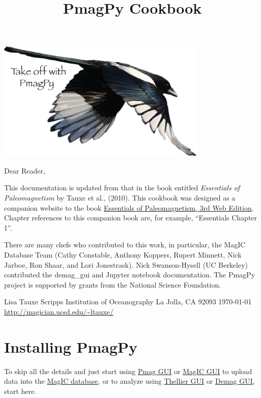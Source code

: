 \documentclass[11pt]{book}
\begin{document}
 \setcounter{tocdepth}{3}
\tableofcontents


{\hskip 1in \includegraphics[width=10cm]{EPSfiles/logo.eps}

 \title{PmagPy Cookbook}

 \maketitle
\noindent Dear Reader,

This documentation is updated from that in the book entitled {\it Essentials of Paleomagnetism} by  Tauxe et al., (2010). \nocite{tauxe10}  This cookbook was designed as a companion website to the book \href{http://earthref.org/MAGIC/books/Tauxe/Essentials/WebBook3.html}{Essentials of Paleomagnetism, 3rd Web Edition}. Chapter references to this companion book are, for example, ``Essentials Chapter 1''.

There are many chefs who contributed to this work, in particular, the MagIC Database Team (Cathy Constable, Anthony Koppers, Rupert Minnett, Nick Jarboe, Ron Shaar, and Lori Jonestrask). Nick Swanson-Hysell (UC Berkeley) contributed the demag\_gui and Jupyter notebook documentation. The PmagPy project is supported by grants from the National Science Foundation.

{\obeylines
 Lisa Tauxe
 Scripps Institution of Oceanography
 La Jolla, CA 92093
 \today
  \url{http://magician.ucsd.edu/~ltauxe/}
 }


\chapter{Installing {\bf PmagPy}}

To skip all the details and just start using \href{#pmag_gui.py}{Pmag GUI} or \href{#magic_gui.py}{MagIC GUI} to upload data into the \href{#MagICDatabase}{MagIC database}, or to analyze using \href{#thellier_GUI.py}{Thellier GUI} or \href{#DemagGUI}{Demag GUI}, start here.

}
\end{document}
